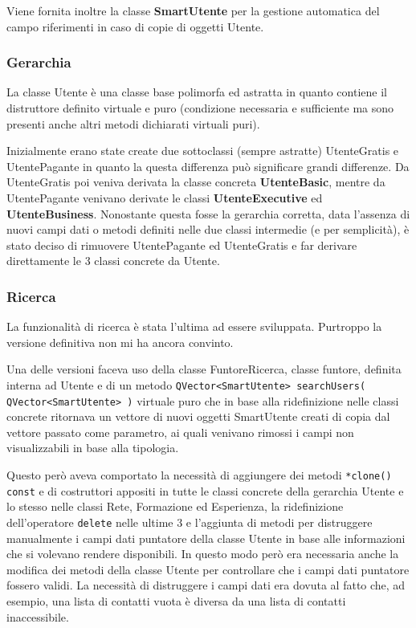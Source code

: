 \documentclass[a4paper,10pt]{article}
\begin{document}
Viene fornita inoltre la classe \textbf{SmartUtente} per la gestione automatica del campo riferimenti in caso di copie di oggetti Utente.

\subsubsection*{Gerarchia}
La classe Utente è una classe base polimorfa ed astratta in quanto contiene il distruttore definito virtuale e puro (condizione necessaria e sufficiente ma sono presenti anche altri metodi dichiarati virtuali puri).

Inizialmente erano state create due sottoclassi (sempre astratte) UtenteGratis e UtentePagante in quanto la questa differenza può significare grandi differenze. Da UtenteGratis poi veniva derivata la classe concreta \textbf{UtenteBasic}, mentre da UtentePagante venivano derivate le classi \textbf{UtenteExecutive} ed \textbf{UtenteBusiness}. Nonostante questa fosse la gerarchia corretta, data l'assenza di nuovi campi dati o metodi definiti nelle due classi intermedie (e per semplicità), è stato deciso di rimuovere UtentePagante ed UtenteGratis e far derivare direttamente le 3 classi concrete da Utente.

\subsubsection*{Ricerca}
La funzionalità di ricerca è stata l'ultima ad essere sviluppata. Purtroppo la versione definitiva non mi ha ancora convinto.

Una delle versioni faceva uso della classe FuntoreRicerca, classe funtore, definita interna ad Utente e di un metodo \texttt{QVector<SmartUtente> searchUsers( QVector<SmartUtente> )} virtuale puro che in base alla ridefinizione nelle classi concrete ritornava un vettore di nuovi oggetti SmartUtente creati di copia dal vettore passato come parametro, ai quali venivano rimossi i campi non visualizzabili in base alla tipologia. 

Questo però aveva comportato la necessità di aggiungere dei metodi \texttt{*clone() const} e di costruttori appositi in tutte le classi concrete della gerarchia Utente e lo stesso nelle classi Rete, Formazione ed Esperienza, la ridefinizione dell'operatore \texttt{delete} nelle ultime 3 e l'aggiunta di metodi per distruggere manualmente i campi dati puntatore della classe Utente in base alle informazioni che si volevano rendere disponibili. In questo modo però era necessaria anche la modifica dei metodi della classe Utente per controllare che i campi dati puntatore fossero validi. La necessità di distruggere i campi dati era dovuta al fatto che, ad esempio, una lista di contatti vuota è diversa da una lista di contatti inaccessibile.
\end{document}
